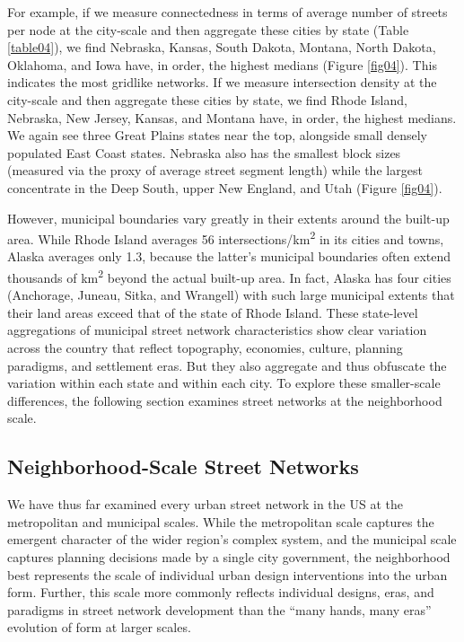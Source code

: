 \documentclass{article}
\begin{document}
For example, if we measure connectedness in terms of average number of streets per node at the city-scale and then aggregate these cities by state (Table \ref{table04}), we find Nebraska, Kansas, South Dakota, Montana, North Dakota, Oklahoma, and Iowa have, in order, the highest medians (Figure \ref{fig04}). This indicates the most gridlike networks. If we measure intersection density at the city-scale and then aggregate these cities by state, we find Rhode Island, Nebraska, New Jersey, Kansas, and Montana have, in order, the highest medians. We again see three Great Plains states near the top, alongside small densely populated East Coast states. Nebraska also has the smallest block sizes (measured via the proxy of average street segment length) while the largest concentrate in the Deep South, upper New England, and Utah (Figure \ref{fig04}).

However, municipal boundaries vary greatly in their extents around the built-up area. While Rhode Island averages 56 intersections/km\textsuperscript{2} in its cities and towns, Alaska averages only 1.3, because the latter's municipal boundaries often extend thousands of km\textsuperscript{2} beyond the actual built-up area. In fact, Alaska has four cities (Anchorage, Juneau, Sitka, and Wrangell) with such large municipal extents that their land areas exceed that of the state of Rhode Island. These state-level aggregations of municipal street network characteristics show clear variation across the country that reflect topography, economies, culture, planning paradigms, and settlement eras. But they also aggregate and thus obfuscate the variation within each state and within each city. To explore these smaller-scale differences, the following section examines street networks at the neighborhood scale.



\subsection{Neighborhood-Scale Street Networks}

We have thus far examined every urban street network in the US at the metropolitan and municipal scales. While the metropolitan scale captures the emergent character of the wider region's complex system, and the municipal scale captures planning decisions made by a single city government, the neighborhood best represents the scale of individual urban design interventions into the urban form. Further, this scale more commonly reflects individual designs, eras, and paradigms in street network development than the \enquote{many hands, many eras} evolution of form at larger scales.
\end{document}
